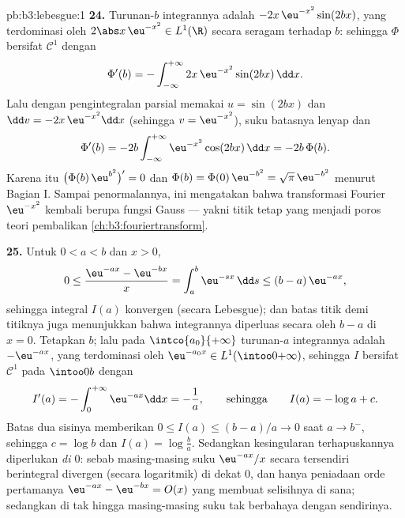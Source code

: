 \begin{solution}{pb:b3:lebesgue:1}
\textbf{24.} Turunan-$b$ integrannya adalah
$-2x\,\eu^{-x^2}\sin(2bx)$, yang terdominasi oleh $2\abs
x\,\eu^{-x^2} \in L^1(\R)$ secara seragam terhadap $b$: sehingga $\Phi$ bersifat
$\mathcal C^1$ dengan
\[
\Phi'(b) = -\int_{-\infty}^{+\infty}
2x\,\eu^{-x^2}\sin(2bx)\,\dd x .
\]
Lalu dengan pengintegralan parsial memakai $u = \sin(2bx)$ dan $\dd v =
-2x\,\eu^{-x^2}\dd x$ (sehingga $v = \eu^{-x^2}$), suku batasnya
lenyap dan
\[
\Phi'(b) = -2b\int_{-\infty}^{+\infty}
\eu^{-x^2}\cos(2bx)\,\dd x = -2b\,\Phi(b).
\]
Karena itu $\bigl(\Phi(b)\,\eu^{b^2}\bigr)' = 0$ dan $\Phi(b) =
\Phi(0)\,\eu^{-b^2} = \sqrt\pi\,\eu^{-b^2}$ menurut Bagian I. Sampai
penormalannya, ini mengatakan bahwa transformasi Fourier
$\eu^{-x^2}$ kembali berupa fungsi Gauss --- yakni titik tetap yang menjadi
poros teori pembalikan \cref{ch:b3:fouriertransform}.

\textbf{25.} Untuk $0 < a < b$ dan $x > 0$,
\[
0 \leq \frac{\eu^{-ax} - \eu^{-bx}}{x}
= \int_a^b \eu^{-sx}\,\dd s \leq (b - a)\,\eu^{-ax},
\]
sehingga integral $I(a)$ konvergen (secara Lebesgue); dan batas titik demi
titiknya juga menunjukkan bahwa integrannya diperluas secara  oleh $b -
a$ di $x = 0$. Tetapkan $b$; lalu pada $\intco{a_0}{+\infty}$
turunan-$a$ integrannya adalah $-\eu^{-ax}$, yang terdominasi oleh
$\eu^{-a_0x} \in L^1(\intoo0{+\infty})$, sehingga $I$ bersifat $\mathcal
C^1$ pada $\intoo0b$ dengan
\[
I'(a) = -\int_0^{+\infty}\eu^{-ax}\dd x = -\frac1a,
\qquad\text{sehingga}\qquad
I(a) = -\log a + c .
\]
Batas dua sisinya memberikan $0 \leq I(a) \leq (b-a)/a \to 0$ saat
$a \to b^-$, sehingga $c = \log b$ dan $I(a) = \log\frac ba$. Sedangkan
kesingularan terhapuskannya diperlukan \emph{di $0$}: sebab masing-masing suku
$\eu^{-ax}/x$ secara tersendiri berintegral divergen (secara
logaritmik) di dekat $0$, dan hanya peniadaan orde pertamanya
$\eu^{-ax} - \eu^{-bx} = O(x)$ yang membuat selisihnya
 di sana; sedangkan di tak hingga masing-masing suku tak berbahaya
dengan sendirinya.

\end{solution}
